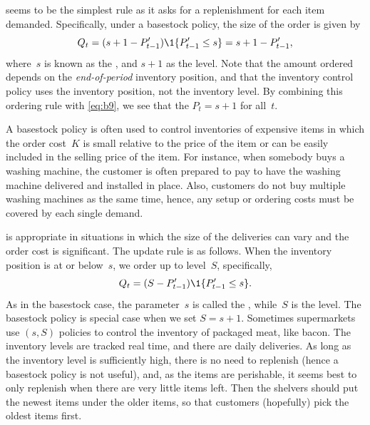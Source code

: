 \documentclass[queueing-book.tex]{subfiles}
\begin{document}
 seems to be the simplest rule as it asks for a replenishment for each item demanded. Specifically, under a basestock policy, the  size of the order is given by
\begin{equation*}
  Q_t = (s+1-\IP_{t-1}')\1{\IP_{t-1}' \leq s} = s+1-\IP_{t-1}',
\end{equation*}
where~$s$ is known as the , and $s+1$ as the  level.
Note that the amount ordered depends on the \emph{end-of-period} inventory position, and that the inventory control policy uses the inventory position, not the inventory level. By combining this ordering rule with \cref{eq:b9}, we see that the $P_t=s+1$ for all~$t$.


A basestock policy is often used to control inventories of expensive items in which the order cost~$K$ is small relative to the price of the item or can be easily included in the selling price of the item. For instance, when somebody buys a washing machine, the customer is often prepared to pay to have the washing machine delivered and installed in place. Also, customers do not buy multiple washing machines as the same time, hence, any setup or ordering costs must be covered by  each single demand.



 is appropriate in situations in which the size of the deliveries can vary and the order cost is significant. The update rule is as follows.
When the inventory position is at or below~$s$, we order up to level~$S$, specifically,
\begin{equation*}
  Q_t = (S-\IP_{t-1}')\1{\IP_{t-1}' \leq s}.
\end{equation*}
As in the basestock case, the parameter~$s$ is called the , while~$S$ is the  level.
The basestock policy is special case when we set $S=s+1$.
Sometimes supermarkets use $(s,S)$ policies to control the inventory of packaged meat, like bacon.
The inventory levels are tracked real time, and there are daily deliveries.
As long as the inventory level is sufficiently high, there is no need to replenish (hence a basestock policy is not useful), and, as the items are perishable, it seems best to only replenish when there are very little items left.
Then the shelvers should put the newest items under the older items, so that customers (hopefully) pick the oldest items first.
\end{document}
